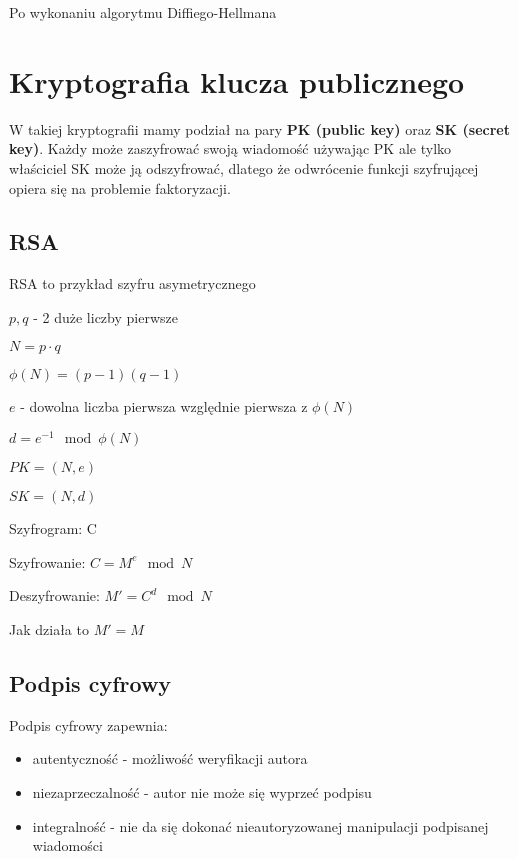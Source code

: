 \begin{problems}
    
    \prob Po wykonaniu algorytmu Diffiego-Hellmana
    
\end{problems}    

\section{Kryptografia klucza publicznego}

W takiej kryptografii mamy podział na pary \textbf{PK (public key)} oraz \textbf{SK (secret key)}. Każdy może zaszyfrować swoją wiadomość używając PK ale tylko właściciel SK może ją odszyfrować, dlatego że odwrócenie funkcji szyfrującej opiera się na problemie faktoryzacji.

\subsection{RSA}
RSA to przykład szyfru asymetrycznego

$p, q$ - 2 duże liczby pierwsze

$N = p \cdot q$

$\phi(N) = (p-1)(q-1)$

$e$ - dowolna liczba pierwsza względnie pierwsza z $\phi(N)$

$d = e^{-1} \mod \phi(N)$

$PK = (N, e)$

$SK = (N, d)$

Szyfrogram: C

Szyfrowanie: $C = M^e \mod N$

Deszyfrowanie: $M' = C^d \mod N$

Jak działa to $M' = M$

\subsection{Podpis cyfrowy}
Podpis cyfrowy zapewnia:
\begin{itemize}
    \item autentyczność - możliwość weryfikacji autora

    \item niezaprzeczalność - autor nie może się wyprzeć podpisu

    \item integralność - nie da się dokonać nieautoryzowanej manipulacji podpisanej wiadomości
\end{itemize}

